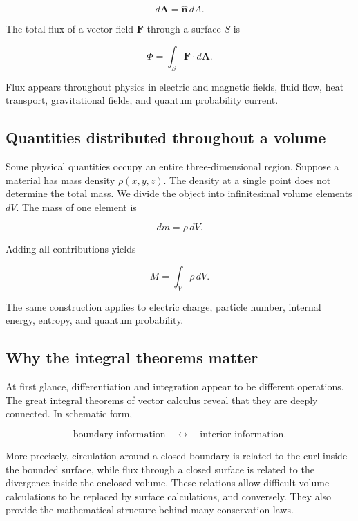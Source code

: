 \begin{equation}
  d\mathbf A=\hat{\mathbf n}\,dA.
\end{equation}

The total flux of a vector field $\mathbf F$ through a surface $S$ is

\begin{equation}
  \boxed{\Phi=\int_S \mathbf F\cdot d\mathbf A.}
\end{equation}

Flux appears throughout physics in electric and magnetic fields, fluid flow,
heat transport, gravitational fields, and quantum probability current.

\subsection{Quantities distributed throughout a volume}

Some physical quantities occupy an entire three-dimensional region. Suppose a
material has mass density $\rho(x,y,z)$. The density at a single point does not
determine the total mass. We divide the object into infinitesimal volume
elements $dV$. The mass of one element is

\begin{equation}
  dm=\rho\,dV.
\end{equation}

Adding all contributions yields

\begin{equation}
  \boxed{M=\int_V \rho\,dV.}
\end{equation}

The same construction applies to electric charge, particle number, internal
energy, entropy, and quantum probability.

\subsection{Why the integral theorems matter}

At first glance, differentiation and integration appear to be different
operations. The great integral theorems of vector calculus reveal that they are
deeply connected. In schematic form,

\begin{equation}
  \boxed{\text{boundary information}\quad\longleftrightarrow\quad
  \text{interior information}.}
\end{equation}

More precisely, circulation around a closed boundary is related to the curl
inside the bounded surface, while flux through a closed surface is related to
the divergence inside the enclosed volume. These relations allow difficult
volume calculations to be replaced by surface calculations, and conversely.
They also provide the mathematical structure behind many conservation laws.

